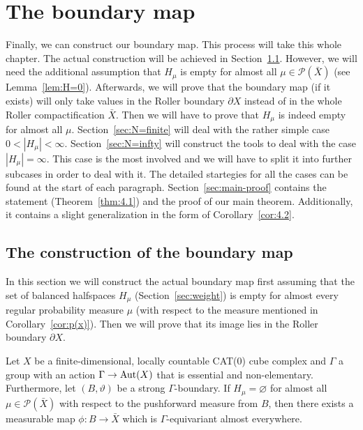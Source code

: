 \section{The boundary map}
\label{sec:map}

Finally, we can construct our boundary map. This process will take this whole chapter. The actual construction will be achieved in Section~\ref{sec:construction}. However, we will need the additional assumption that \(H_\mu\) is empty for almost all \(\mu \in \mathcal{P}(\bar X)\) (see Lemma~\ref{lem:H=0}). Afterwards, we will prove that the boundary map (if it exists) will only take values in the Roller boundary \(\partial X\) instead of in the whole Roller compactification \(\bar X\). Then we will have to prove that \(H_\mu\) is indeed empty for almost all \(\mu\). Section~\ref{sec:N=finite} will deal with the rather simple case \(0 < |H_\mu| < \infty\). Section~\ref{sec:N=infty} will construct the tools to deal with the case \(|H_\mu| = \infty\). This case is the most involved and we will have to split it into further subcases in order to deal with it. The detailed startegies for all the cases can be found at the start of each paragraph. Section~\ref{sec:main-proof} contains the statement (Theorem~\ref{thm:4.1}) and the proof of our main theorem. Additionally, it contains a slight generalization in the form of Corollary~\ref{cor:4.2}.

\subsection{The construction of the boundary map}
\label{sec:construction}
In this section we will construct the actual boundary map first assuming that the set of balanced halfspaces \(H_\mu\) (Section~\ref{sec:weight}) is empty for almost every regular probability measure \(\mu\) (with respect to the measure mentioned in Corollary~\ref{cor:p(x)}). Then we will prove that its image lies in the Roller boundary \(\partial X\).

\begin{lemma}
  \label{lem:H=0}
  Let \(X\) be a finite-dimensional, locally countable CAT(0) cube complex and \(\Gamma\) a group with an action \(\Gamma \to \operatorname{Aut}(X)\) that is essential and non-elementary. Furthermore, let \((B, \vartheta)\) be a strong \(\Gamma\)-boundary. If \(H_\mu = \varnothing\) for almost all \(\mu \in \mathcal{P}(\bar X)\) with respect to the pushforward measure from \(B\), then there exists a measurable map \(\phi\colon B \to \bar X\) which is \(\Gamma\)-equivariant almost everywhere.
\end{lemma}

